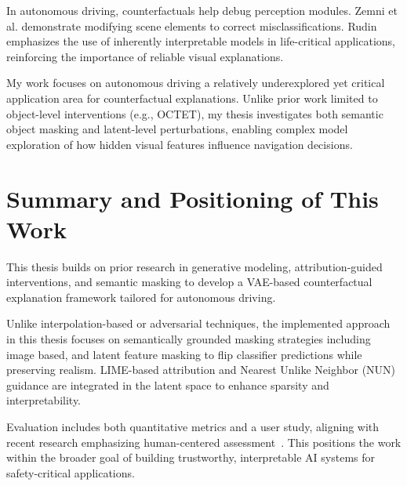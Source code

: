 In autonomous driving, counterfactuals help debug perception modules. Zemni et al.\cite{zemni2023octetobjectawarecounterfactualexplanations} demonstrate modifying scene elements to correct misclassifications. Rudin\cite{Rudin2019} emphasizes the use of inherently interpretable models in life-critical applications, reinforcing the importance of reliable visual explanations.

My work focuses on autonomous driving a relatively underexplored yet critical application area for counterfactual explanations. Unlike prior work limited to object-level interventions (e.g., OCTET), my thesis investigates both semantic object masking and latent-level perturbations, enabling complex model exploration of how hidden visual features influence navigation decisions.

\section{Summary and Positioning of This Work}
This thesis builds on prior research in generative modeling, attribution-guided interventions, and semantic masking to develop a VAE-based counterfactual explanation framework tailored for autonomous driving.

Unlike interpolation-based or adversarial techniques, the implemented approach in this thesis focuses on semantically grounded masking strategies including image based, and latent feature masking to flip classifier predictions while preserving realism. LIME-based attribution and Nearest Unlike Neighbor (NUN) guidance are integrated in the latent space to enhance sparsity and interpretability.

Evaluation includes both quantitative metrics and a user study, aligning with recent research emphasizing human-centered assessment~\cite{DELANEY2023103995}. This positions the work within the broader goal of building trustworthy, interpretable AI systems for safety-critical applications.